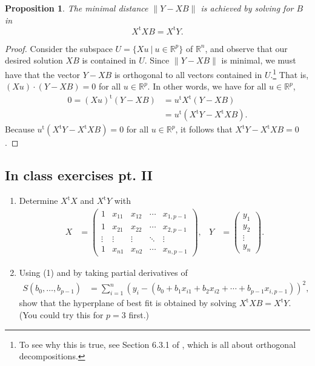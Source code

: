 \documentclass[a4paper, 12pt]{article}
\numberwithin{equation}{section}
\numberwithin{figure}{section}
\newtheorem{prop}[thm]{Proposition}
\theoremstyle{definition}
\newcommand{\R}{\mathbb{R}}
\newcommand{\tr}{\mathrm{t}}
\begin{document}
\begin{prop}
	The minimal distance $\| Y - XB \|$ is achieved by solving for $B$ in 
	\[ 
		X^{\tr} X B = X^{\tr} Y.
	\] 
\end{prop}

\begin{proof} 
	Consider the subspace $U = \{Xu ~|~ u\in\R^p\}$ of $\R^n$, and observe that
	our desired solution $XB$ is contained in $U$. Since $\| Y - XB \|$ is
	minimal, we must have that the vector $Y - XB$ is orthogonal to all vectors
	contained in $U$.\footnote{To see why this is true, see Section 6.3.1 of
	\cite{ILA}, which is all about orthogonal decompositions.} That is, $(Xu)
	\cdot (Y - XB) = 0$ for all $u\in\R^p$. In other words, we have for all
	$u\in \R^p$,
	\begin{align*} 
		0 = (Xu)^{\tr} (Y - XB) &= u^{\tr} X^{\tr}(Y - XB) \\
		&= u^{\tr} \left(X^{\tr}Y - X^{\tr}XB\right).
	\end{align*}
	Because $u^{\tr} \left(X^{\tr}Y - X^{\tr}XB\right)=0$ for all $u\in \R^p$,
	it follows that $X^{\tr}Y - X^{\tr}XB=0$. 
\end{proof}

\subsection{In class exercises pt. II}

\begin{enumerate}
	\item Determine $X^{\tr}X$ and $X^{\tr}Y$ with
	\begin{align*}
		X &= \begin{pmatrix}
			1 & x_{11} & x_{12} & \cdots & x_{1,p-1} \\
			1 & x_{21} & x_{22} & \cdots & x_{2,p-1} \\
			\vdots & \vdots & \vdots & \ddots & \vdots \\
			1 & x_{n1} & x_{n2} & \cdots & x_{n,p-1} 
		\end{pmatrix}, & 
		Y &= \begin{pmatrix}
			y_1 \\ y_2 \\ \vdots \\ y_n 
		\end{pmatrix}.
	\end{align*}
	\item Using (1) and by taking partial derivatives of 
	\begin{align}\label{eqn:S-function}
		S(b_0, \dots, b_{p-1}) &= \sum_{i=1}^n (y_i - (b_0 + b_1x_{i1} + b_2x_{i2} + \cdots + b_{p-1}x_{i,p-1}))^2,
	\end{align}
	show that the hyperplane of best fit is obtained by solving
	$X^{\tr}XB=X^{\tr}Y$. (You could try this for $p=3$ first.)
\end{enumerate}
\end{document}
